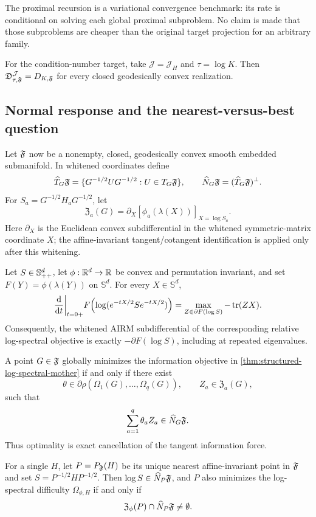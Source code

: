 The proximal recursion is a variational convergence benchmark: its rate is
conditional on solving each global proximal subproblem.  No claim is made that
those subproblems are cheaper than the original target projection for an
arbitrary family.

For the condition-number target, take \(\mathcal J=\mathcal J_H\) and \(\tau=\log K\).  Then
\(\mathfrak D_{\tau,\mathfrak F}^{\mathcal J}=D_{K,\mathfrak F}\) for every closed
geodesically convex realization.

\subsection{Normal response and the nearest-versus-best question}

Let \(\mathfrak F\) now be a nonempty, closed, geodesically convex smooth embedded
submanifold.  In whitened coordinates define
\[
  \widehat T_G\mathfrak F
  =\{G^{-1/2}UG^{-1/2}:U\in T_G\mathfrak F\},
  \qquad
  \widehat N_G\mathfrak F=(\widehat T_G\mathfrak F)^\perp.
\]
For \(S_a=G^{-1/2}H_aG^{-1/2}\), let
\[
  \mathfrak Z_a(G)
  =
  \partial_X[\phi_a(\lambda(X))]_{X=\log S_a}.
\]
Here \(\partial_X\) is the Euclidean convex subdifferential in the whitened
symmetric-matrix coordinate \(X\); the affine-invariant tangent/cotangent
identification is applied only after this whitening.

\begin{lemma}
\label{lem:log-spectral-pullback}
Let \(S\in\mathbb S_{++}^d\), let \(\phi:\mathbb R^d\to\mathbb R\) be convex and
permutation invariant, and set \(F(Y)=\phi(\lambda(Y))\) on
\(\mathbb S^d\).  For every \(X\in\mathbb S^d\),
\[
  \frac{\mathrm d}{\mathrm d t}\bigg|_{t=0+}
  F\!\left(\log(e^{-tX/2}Se^{-tX/2})\right)
  =
  \max_{Z\in\partial F(\log S)}-\operatorname{tr}(ZX).
\]
Consequently, the whitened AIRM subdifferential of the corresponding relative
log-spectral objective is exactly \(-\partial F(\log S)\), including at
repeated eigenvalues.
\end{lemma}

\begin{theorem}
\label{thm:normal-response-law}
A point \(G\in\mathfrak F\) globally minimizes the information objective in
\cref{thm:structured-log-spectral-mother} if and only if there exist
\[
  \theta\in\partial\rho(\Omega_1(G),\ldots,\Omega_q(G)),
  \qquad
  Z_a\in\mathfrak Z_a(G),
\]
such that
\[
  \sum_{a=1}^q\theta_aZ_a\in\widehat N_G\mathfrak F.
\]
Thus optimality is exact cancellation of the tangent information force.

For a single \(H\), let \(P=P_\mathfrak F(H)\) be its unique nearest affine-invariant point
in \(\mathfrak F\) and set \(S=P^{-1/2}HP^{-1/2}\).  Then
\(\log S\in\widehat N_P\mathfrak F\), and \(P\) also minimizes the log-spectral
difficulty \(\Omega_{\phi,H}\) if and only if
\[
  \mathfrak Z_\phi(P)\cap\widehat N_P\mathfrak F\ne\emptyset.
\]
\end{theorem}

